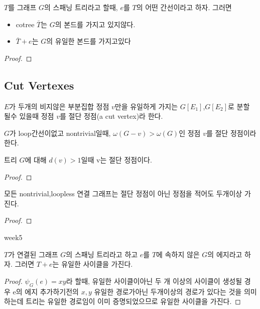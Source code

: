 \begin{theorem}
    $T$를 그래프 $G$의 스패닝 트리라고 할때, $e$를 $T$의 어떤 간선이라고 하자. 그러면
    \begin{itemize}
        \item cotree $\bar{T}$는 $G$의 본드를 가지고 있지않다.        
        \item $\bar{T}+e$는 $G$의 유일한 본드를 가지고있다
    \end{itemize}
\end{theorem}

\begin{proof}
    
\end{proof}

\subsection{Cut Vertexes}

\begin{dfn}
    $E$가 두개의 비지않은 부분집합 정점 $v$만을 유일하게 가지는 $G[E_1]$,$G[E_2]$로 분할 될수 있을때 정점 $v$를 절단 정점(a cut vertex)라 한다.
    
    $G$가 loop간선이없고 nontrivial일때, $\omega(G-v) > \omega(G)$인 정점 $v$를 절단 정점이라 한다.
\end{dfn}

\begin{theorem}
    트리 $G$에 대해 $d(v) > 1$일때 v는 절단 정점이다.   
\end{theorem}

\begin{proof}
    
\end{proof}

\begin{corollary}
    모든 nontrivial,loopless 연결 그래프는 절단 정점이 아닌 정점을 적어도 두개이상 가진다.
\end{corollary}


\begin{proof}
    
\end{proof}

week5



\begin{theorem}
    $T$가 연결된 그래프 $G$의 스패닝 트리라고 하고 $e$를 $T$에 속하지 않은 $G$의 에지라고 하자. 그러면 $T + e$는 유일한 사이클을 가진다.
\end{theorem}
\begin{proof}
    $\psi_G(e) = xy$라 할때, 유일한 사이클이아닌 두 개 이상의 사이클이 생성될 경우  e의 에지 추가하기전의 $x, y$ 유일한 경로가아닌 두개이상의 경로가 있다는 것을 의미하는데 트리는 유일한 경로임이 이미 증명되었으므로 유일한 사이클을 가진다.
\end{proof}







